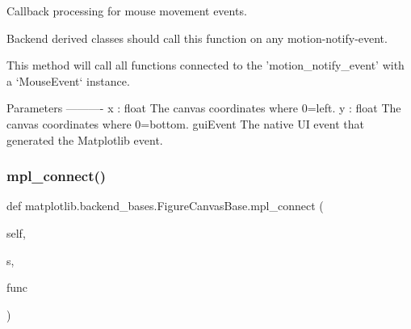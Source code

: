\begin{DoxyVerb}Callback processing for mouse movement events.

Backend derived classes should call this function on any
motion-notify-event.

This method will call all functions connected to the
'motion_notify_event' with a `MouseEvent` instance.

Parameters
----------
x : float
    The canvas coordinates where 0=left.
y : float
    The canvas coordinates where 0=bottom.
guiEvent
    The native UI event that generated the Matplotlib event.
\end{DoxyVerb}
 \mbox{\label{classmatplotlib_1_1backend__bases_1_1FigureCanvasBase_a26e2df80d5806ac01ca7fe5ae4d0ec87}} 
\subsubsection{\texorpdfstring{mpl\+\_\+connect()}{mpl\_connect()}}
{\footnotesize\ttfamily def matplotlib.\+backend\+\_\+bases.\+Figure\+Canvas\+Base.\+mpl\+\_\+connect (\begin{DoxyParamCaption}\item[{}]{self,  }\item[{}]{s,  }\item[{}]{func }\end{DoxyParamCaption})}

